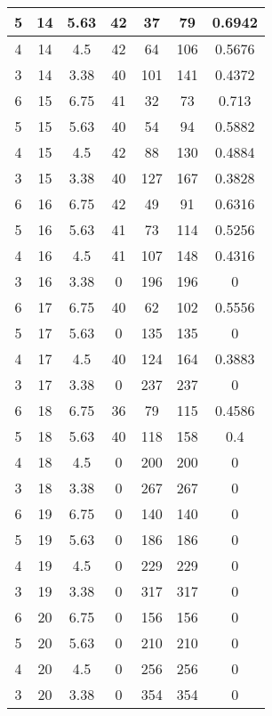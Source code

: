 \documentclass[letterpaper, 12pt]{article}
\begin{document}
\begin{longtable}{|c|c|c|c|c|c|c|}
\hline
5 & 14 & 5.63 & 42 & 37 & 79 & 0.6942 \\
\hline
4 & 14 & 4.5 & 42 & 64 & 106 & 0.5676 \\
\hline
3 & 14 & 3.38 & 40 & 101 & 141 & 0.4372 \\
\hline
6 & 15 & 6.75 & 41 & 32 & 73 & 0.713 \\
\hline
5 & 15 & 5.63 & 40 & 54 & 94 & 0.5882 \\
\hline
4 & 15 & 4.5 & 42 & 88 & 130 & 0.4884 \\
\hline
3 & 15 & 3.38 & 40 & 127 & 167 & 0.3828 \\
\hline
6 & 16 & 6.75 & 42 & 49 & 91 & 0.6316 \\
\hline
5 & 16 & 5.63 & 41 & 73 & 114 & 0.5256 \\
\hline
4 & 16 & 4.5 & 41 & 107 & 148 & 0.4316 \\
\hline
3 & 16 & 3.38 & 0 & 196 & 196 & 0 \\
\hline
6 & 17 & 6.75 & 40 & 62 & 102 & 0.5556 \\
\hline
5 & 17 & 5.63 & 0 & 135 & 135 & 0 \\
\hline
4 & 17 & 4.5 & 40 & 124 & 164 & 0.3883 \\
\hline
3 & 17 & 3.38 & 0 & 237 & 237 & 0 \\
\hline
6 & 18 & 6.75 & 36 & 79 & 115 & 0.4586 \\
\hline
5 & 18 & 5.63 & 40 & 118 & 158 & 0.4 \\
\hline
4 & 18 & 4.5 & 0 & 200 & 200 & 0 \\
\hline
3 & 18 & 3.38 & 0 & 267 & 267 & 0 \\
\hline
6 & 19 & 6.75 & 0 & 140 & 140 & 0 \\
\hline
5 & 19 & 5.63 & 0 & 186 & 186 & 0 \\
\hline
4 & 19 & 4.5 & 0 & 229 & 229 & 0 \\
\hline
3 & 19 & 3.38 & 0 & 317 & 317 & 0 \\
\hline
6 & 20 & 6.75 & 0 & 156 & 156 & 0 \\
\hline
5 & 20 & 5.63 & 0 & 210 & 210 & 0 \\
\hline
4 & 20 & 4.5 & 0 & 256 & 256 & 0 \\
\hline
3 & 20 & 3.38 & 0 & 354 & 354 & 0 \\
\hline
\end{longtable}
\end{document}
